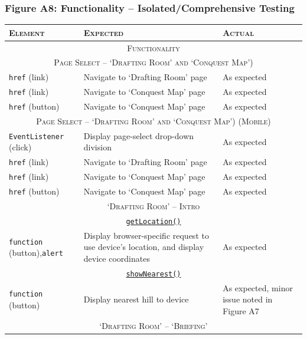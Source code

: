 \documentclass[11pt, english]{article}
\begin{document}
\newpage

		\subsubsection*{Figure A8: Functionality -- Isolated/Comprehensive Testing}

	\begin{center}
		\scriptsize
	\begin{longtable}{p{3cm}p{8cm}p{2cm}}
		\textsc{Element} & \textsc{Expected} & \textsc{Actual}\\
		\hline
		\hline
		\multicolumn{3}{c}{\textsc{Functionality}}\\
		\hline
		\hline
		\multicolumn{3}{c}{\textsc{Page Select -- `Drafting Room' and `Conquest Map')}}\\
		\hline
		\texttt{href} (link) & Navigate to `Drafting Room' page & As expected\\
		\texttt{href} (link) & Navigate to `Conquest Map' page & As expected\\
		\texttt{href} (button) & Navigate to `Conquest Map' page & As expected\\
		\hline
		\multicolumn{3}{c}{\textsc{Page Select -- `Drafting Room' and `Conquest Map') (Mobile)}}\\
		\hline
		\texttt{EventListener} (click) & Display page-select drop-down division & As expected\\
		\texttt{href} (link) & Navigate to `Drafting Room' page & As expected\\
		\texttt{href} (link) & Navigate to `Conquest Map' page & As expected\\
		\texttt{href} (button) & Navigate to `Conquest Map' page & As expected\\
		\hline
		\multicolumn{3}{c}{\textsc{`Drafting Room' -- Intro}}\\
		\hline
		\multicolumn{3}{c}{\underline{\texttt{getLocation()}}}\\
		\texttt{function} (button),\newline \texttt{alert} & Display browser-specific request to use device's location, and display device coordinates & As expected\\
		\multicolumn{3}{c}{\underline{\texttt{showNearest()}}}\\
		\texttt{function} (button) & Display nearest hill to device & As expected, minor issue noted in Figure A7\\
		\hline
		\multicolumn{3}{c}{\textsc{`Drafting Room' -- `Briefing'}}\\

\end{longtable}
\end{center}
\end{document}
